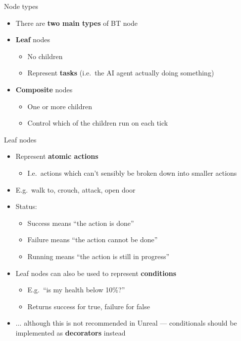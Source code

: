 \begin{frame}{Node types}
	\begin{itemize}
		\pause\item There are \textbf{two main types} of BT node
		\pause\item \textbf{Leaf} nodes
			\begin{itemize}
				\pause\item No children
				\pause\item Represent \textbf{tasks} (i.e.\ the AI agent actually doing something)
			\end{itemize}
		\pause\item \textbf{Composite} nodes
			\begin{itemize}
				\pause\item One or more children
				\pause\item Control which of the children run on each tick
			\end{itemize}
	\end{itemize}
\end{frame}

\begin{frame}{Leaf nodes}
	\begin{itemize}
		\pause\item Represent \textbf{atomic actions}
			\begin{itemize}
				\pause\item I.e.\ actions which can't sensibly be broken down into smaller actions
			\end{itemize}
		\pause\item E.g.\ walk to, crouch, attack, open door
		\pause\item Status:
			\begin{itemize}
				\pause\item Success means ``the action is done''
				\pause\item Failure means ``the action cannot be done''
				\pause\item Running means ``the action is still in progress''
			\end{itemize}
		\pause\item Leaf nodes can also be used to represent \textbf{conditions}
			\begin{itemize}
				\pause\item E.g.\ ``is my health below 10\%?''
				\pause\item Returns success for true, failure for false
			\end{itemize}
		\pause\item ... although this is not recommended in Unreal ---
			conditionals should be implemented as \textbf{decorators} instead
	\end{itemize}
\end{frame}

